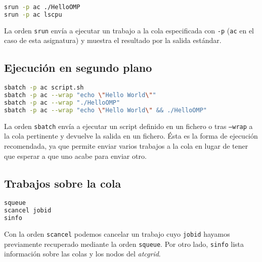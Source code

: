 \begin{lstlisting}[language=sh]
srun -p ac ./HelloOMP
srun -p ac lscpu
\end{lstlisting}

La orden \texttt{srun} envía a ejecutar un trabajo a la cola especificada con \texttt{-p} (\texttt{ac} en el caso de esta asignatura) y muestra el resultado por la salida estándar.

\subsection{Ejecución en segundo plano}

\begin{lstlisting}[language=sh]
sbatch -p ac script.sh
sbatch -p ac --wrap "echo \"Hello World\""
sbatch -p ac --wrap "./HelloOMP"
sbatch -p ac --wrap "echo \"Hello World\" && ./HelloOMP"
\end{lstlisting}

La orden \texttt{sbatch} envía a ejecutar un script definido en un fichero o tras \texttt{--wrap} a la cola pertinente y devuelve la salida en un fichero.
Ésta es la forma de ejecución recomendada, ya que permite enviar varios trabajos a la cola en lugar de tener que esperar a que uno acabe para enviar otro.

\subsection{Trabajos sobre la cola}

\begin{lstlisting}[language=sh]
squeue
scancel jobid
sinfo
\end{lstlisting}

Con la orden \texttt{scancel} podemos cancelar un trabajo cuyo \texttt{jobid} hayamos previamente recuperado mediante la orden \texttt{squeue}.
Por otro lado, \texttt{sinfo} lista información sobre las colas y los nodos del \textit{atcgrid}.

